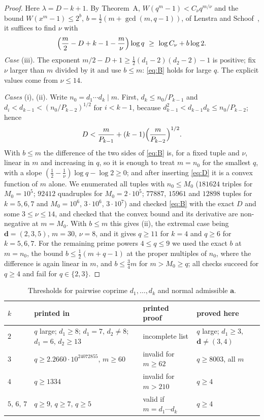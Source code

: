 \documentclass[11pt,a4paper]{amsart}
\theoremstyle{remark}
\newcommand{\bd}{\mathbf{d}}
\newcommand{\ba}{\mathbf{a}}
\begin{document}
\begin{proof}
Here $\lambda=D-k+1$. By Theorem~A, $W(q^m-1)<C_\nu q^{m/\nu}$ and the bound
$W(x^m-1)\le2^{b}$, $b=\tfrac12(m+\gcd(m,q-1))$, of Lenstra and Schoof~\cite{LS}, it suffices to find $\nu$ with
\begin{equation}\label{eq:B}
\Bigl(\frac m2-D+k-1-\frac m\nu\Bigr)\log q\ \ge\ \log C_\nu+b\log2 .
\end{equation}
\emph{Case} (iii). The exponent $m/2-D+1\ge\tfrac12(d_1-2)(d_2-2)-1$ is positive; fix $\nu$ larger than $m$
divided by it and use $b\le m$: \eqref{eq:B} holds for large $q$. The explicit values come from
$\nu\le14$.

\emph{Cases} (i), (ii). Write $n_0=d_1\cdots d_k\mid m$. First, $d_k\le n_0/P_{k-1}$ and
$d_i<d_{k-1}<(n_0/P_{k-2})^{1/2}$ for $i<k-1$, because $d_{k-1}^2<d_{k-1}d_k\le n_0/P_{k-2}$; hence
\begin{equation}\label{eq:D}
D<\frac{m}{P_{k-1}}+(k-1)\Bigl(\frac{m}{P_{k-2}}\Bigr)^{1/2}.
\end{equation}
With $b\le m$ the difference of the two sides of \eqref{eq:B} is, for a fixed tuple and $\nu$, linear in $m$
and increasing in $q$, so it is enough to treat $m=n_0$ for the smallest $q$, with a slope
$(\tfrac12-\tfrac1\nu)\log q-\log2\ge0$; and after inserting \eqref{eq:D} it is a convex function of $m$
alone. We enumerated all tuples with $n_0\le M_0$ ($181624$ triples for $M_0=10^5$; $92412$ quadruples for
$M_0=2\cdot10^5$; $77887$, $15961$ and $12898$ tuples for $k=5,6,7$ and $M_0=10^6$, $3\cdot10^6$,
$3\cdot10^7$) and checked \eqref{eq:B} with the exact $D$ and some $3\le\nu\le14$, and checked that the convex
bound and its derivative are non-negative at $m=M_0$. With $b\le m$ this gives (ii), the extremal case being
$\bd=(2,3,5)$, $m=30$, $\nu=8$, and it gives $q\ge11$ for $k=4$ and $q\ge6$ for $k=5,6,7$. For the remaining
prime powers $4\le q\le9$ we used the exact $b$ at $m=n_0$, the bound $b\le\tfrac12(m+q-1)$ at the proper
multiples of $n_0$, where the difference is again linear in $m$, and $b\le\tfrac34m$ for $m>M_0\ge q$; all
checks succeed for $q\ge4$ and fail for $q\in\{2,3\}$.
\end{proof}

\begin{table}[t]
\centering\footnotesize
\begin{tabular}{@{}llll@{}}
\toprule
$k$ & printed in \cite[Theorem~5.1]{MKB} & printed proof & proved here\\
\midrule
$2$ & $q$ large; $d_1\ge8$; $d_1=7$, $d_2\ne8$; $d_1=6$, $d_2\ge13$ & incomplete list &
$q$ large; $d_1\ge3$, $\bd\ne(3,4)$\\
$3$ & $q\ge2.2660\cdot10^{24072855}$, $m\ge60$ & invalid for $m\ge62$ & $q\ge8003$, all $m$\\
$4$ & $q\ge1334$ & invalid for $m>210$ & $q\ge4$\\
$5,\,6,\,7$ & $q\ge9$, $q\ge7$, $q\ge5$ & valid if $m=d_1\cdots d_k$ & $q\ge4$\\
\bottomrule
\end{tabular}
\medskip
\caption{Thresholds for pairwise coprime $d_1,\dots,d_k$ and normal admissible $\ba$.}\label{tab:thr}
\end{table}
\end{document}
